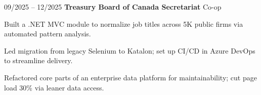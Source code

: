 \begin{twocolentry}{09/2025 – 12/2025} \textbf{Treasury Board of Canada Secretariat}
\newline Co-op \end{twocolentry}
\begin{onecolentry}
\begin{highlights}
\item Built a .NET MVC module to normalize job titles across 5K public firms via automated pattern analysis.
\item Led migration from legacy Selenium to Katalon; set up CI/CD in Azure DevOps to streamline delivery.
\item Refactored core parts of an enterprise data platform for maintainability; cut page load 30\% via leaner data access.
\end{highlights}
\end{onecolentry}
